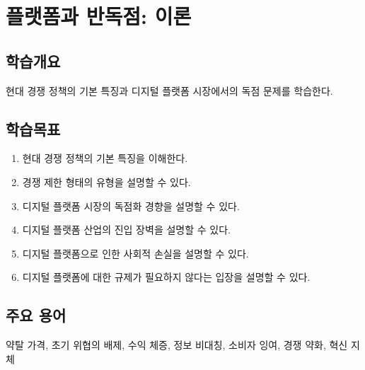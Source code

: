 \chapter{플랫폼과 반독점: 이론}\label{cha:antitrust}

\section*{학습개요}
현대 경쟁 정책의 기본 특징과 디지털 플랫폼 시장에서의 독점 문제를 학습한다.

\section*{학습목표}
\begin{enumerate}
\item 현대 경쟁 정책의 기본 특징을 이해한다.
\item 경쟁 제한 형태의 유형을 설명할 수 있다.
\item 디지털 플랫폼 시장의 독점화 경향을 설명할 수 있다.
\item 디지털 플랫폼 산업의 진입 장벽을 설명할 수 있다.
\item 디지털 플랫폼으로 인한 사회적 손실을 설명할 수 있다.
\item 디지털 플랫폼에 대한 규제가 필요하지 않다는 입장을 설명할 수 있다.
\end{enumerate}

\section*{주요 용어}
약탈 가격, 초기 위협의 배제, 수익 체증, 정보 비대칭, 소비자 잉여, 경쟁 약화, 혁신 지체


\pagebreak

